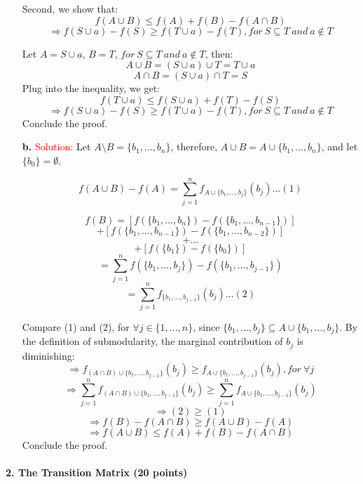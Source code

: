 \documentclass[11pt]{article} %
\begin{document}
\begin{itemize}
Second, we show that:
$$ f(A \cup B) \le f(A)+f(B)-f(A \cap B) $$
$$ \Rightarrow f(S \cup a)-f(S) \ge f(T \cup a)-f(T), for \ S \subseteq T \ and \ a\notin T $$

Let $A=S\cup a$, $B=T$,  $for \ S \subseteq T \ and \ a\notin T $, then:
$$ A\cup B=(S\cup a)\cup T=T\cup a $$ 
$$ A\cap B=(S\cup a)\cap T=S$$ 
Plug into the inequality, we get:
$$ f(T\cup a) \le f(S\cup a)+f(T)-f(S)$$
$$\Rightarrow f(S \cup a)-f(S) \ge f(T \cup a)-f(T), for \ S \subseteq T \ and \ a\notin T  $$
Conclude the proof.  


\item[\textbf{b. }]  
\textcolor{red}{Solution:}
Let $A\setminus B= \{b_1,...,b_n \}$, therefore, $A\cup B=A \cup \{b_1,...,b_n \}$, and let $\{b_0\}=\emptyset$.

$$ f(A \cup B)-f(A)=\sum_{j=1}^{n} f_{A \cup \{b_1,...,b_j \}} (b_j) \dots (1)$$ 

$$ f(B)=[f(\{b_1,...,b_n \})-f( \{b_1,...,b_{n-1} \})]$$
$$ +[f( \{b_1,...,b_{n-1} \})-f( \{b_1,...,b_{n-2} \})]$$
$$ + \dots$$
$$ +[f( \{b_1 \})-f( \{b_0\})]$$
$$=\sum_{j=1}^{n} f( \{b_1,...,b_j \})-f( \{b_1,...,b_{j-1} \})$$ 
$$=\sum_{j=1}^{n} f_{ \{b_1,...,b_{j-1} \}} (b_j) \dots (2)$$

Compare (1) and (2), for $\forall j \in \{ 1,...,n\}$, since $ \{b_1,...,b_j \} \subseteq A \cup \{b_1,...,b_j \}$. By the definition of submodularity, the marginal contribution of $b_j$ is diminishing:
$$ \Rightarrow f_{(A \cap B) \cup \{b_1,...,b_{j-1} \}} (b_j) \ge  f_{A \cup \{b_1,...,b_{j-1} \}} (b_j), for \ \forall j $$
$$ \Rightarrow \sum_{j=1}^{n} f_{(A \cap B) \cup \{b_1,...,b_{j-1} \}} (b_j) \ge \sum_{j=1}^{n} f_{A \cup \{b_1,...,b_{j-1} \}} (b_j) $$
$$ \Rightarrow (2) \ge (1) $$
$$ \Rightarrow f(B)-f(A \cap B) \ge f(A \cup B)-f(A) $$ 
$$ \Rightarrow f(A \cup B) \le f(A)+f(B)-f(A \cap B) $$
Conclude the proof.  

\end{itemize}	
	





















\paragraph{2. The Transition Matrix (20 points)} 
 
\end{document}
